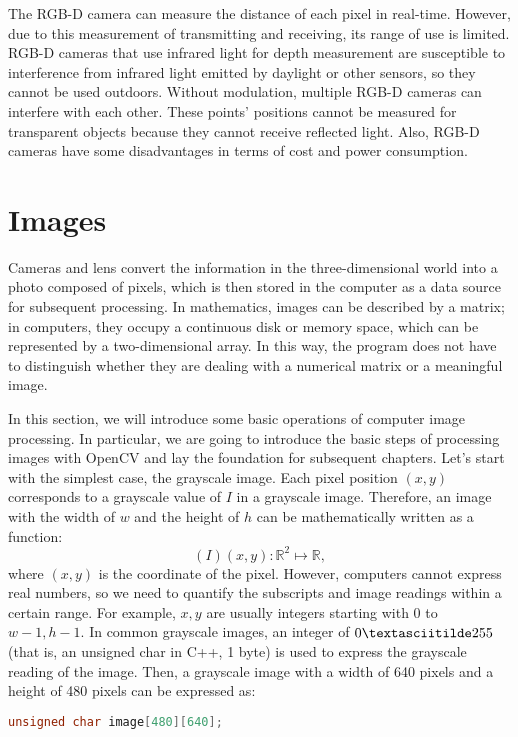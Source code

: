 The RGB-D camera can measure the distance of each pixel in real-time. However, due to this measurement of transmitting and receiving, its range of use is limited. RGB-D cameras that use infrared light for depth measurement are susceptible to interference from infrared light emitted by daylight or other sensors, so they cannot be used outdoors. Without modulation, multiple RGB-D cameras can interfere with each other. These points' positions cannot be measured for transparent objects because they cannot receive reflected light. Also, RGB-D cameras have some disadvantages in terms of cost and power consumption.

\section{Images}
Cameras and lens convert the information in the three-dimensional world into a photo composed of pixels, which is then stored in the computer as a data source for subsequent processing. In mathematics, images can be described by a matrix; in computers, they occupy a continuous disk or memory space, which can be represented by a two-dimensional array. In this way, the program does not have to distinguish whether they are dealing with a numerical matrix or a meaningful image.

In this section, we will introduce some basic operations of computer image processing. In particular, we are going to introduce the basic steps of processing images with OpenCV and lay the foundation for subsequent chapters. Let's start with the simplest case, the grayscale image. Each pixel position $ (x, y) $ corresponds to a grayscale value of $ I $ in a grayscale image. Therefore, an image with the width of $ w $ and the height of $ h $ can be mathematically written as a function:
\[
(I) (x, y): \mathbb {R} ^ 2 \mapsto \mathbb {R},
\]
where $ (x, y) $ is the coordinate of the pixel. However, computers cannot express real numbers, so we need to quantify the subscripts and image readings within a certain range. For example, $ x, y $ are usually integers starting with 0 to $w-1, h-1$. In common grayscale images, an integer of $0 \textasciitilde 255$ (that is, an unsigned char in C++, 1 byte) is used to express the grayscale reading of the image. Then, a grayscale image with a width of 640 pixels and a height of 480 pixels can be expressed as:
\begin{lstlisting}[language=C++, caption=Use 2D array to express an image]
unsigned char image[480][640];
\end{lstlisting}

